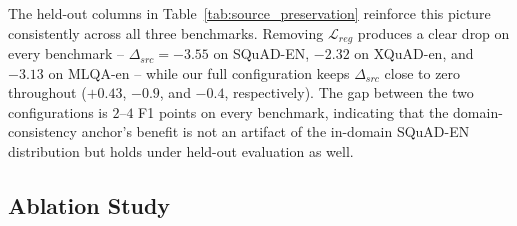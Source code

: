 \documentclass[11pt]{article}
\begin{document}
The held-out columns in Table~\ref{tab:source_preservation} reinforce this picture consistently across all three benchmarks. Removing $\mathcal{L}_{reg}$ produces a clear drop on every benchmark -- $\Delta_{src}=-3.55$ on SQuAD-EN, $-2.32$ on XQuAD-en, and $-3.13$ on MLQA-en -- while our full configuration keeps $\Delta_{src}$ close to zero throughout ($+0.43$, $-0.9$, and $-0.4$, respectively). The gap between the two configurations is $2$--$4$ F1 points on every benchmark, indicating that the domain-consistency anchor's benefit is not an artifact of the in-domain SQuAD-EN distribution but holds under held-out evaluation as well.

\subsection{Ablation Study}

\begin{table}[t]
\centering
\small
{}
\caption{Ablation study isolating the variables of the coordinated alignment framework. All configurations from M1 to M5 utilize domain consistency ($\mathcal{L}_{reg}$) to anchor the source representation. The progression demonstrates the cumulative synergy of spatial and temporal regularizations.}
\label{tab:ablation_study}
\end{table}
\end{document}
